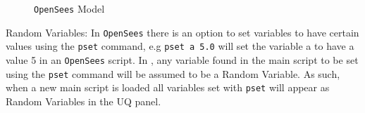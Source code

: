\begin{figure}[!htbp]
  \caption{\texttt{OpenSees} Model}
  \label{fig:figure3}
\end{figure}

Random Variables: In \texttt{OpenSees} there is an option to set
variables to have certain values using the \texttt{pset} command, e.g
\texttt{pset a 5.0} will set the variable a to have a value 5 in an
\texttt{OpenSees} script. In \texttt{\getsoftwarename{}}, any variable
found in the main script to be set using the \texttt{pset} command
will be assumed to be a Random Variable. As such, when a new main
script is loaded all variables set with \texttt{pset} will appear as
Random Variables in the UQ panel.
